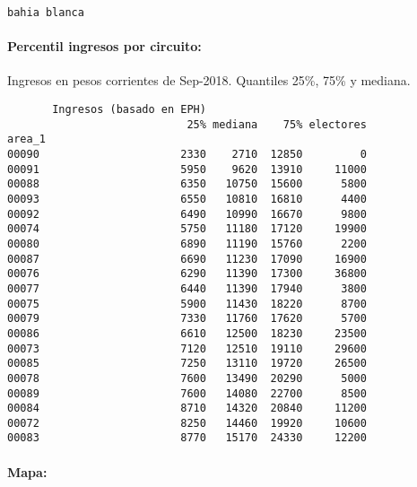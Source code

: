 \documentclass[11pt]{article}
\begin{document}
    
    \begin{Verbatim}[commandchars=\\\{\}]
bahia blanca

    \end{Verbatim}

    \hypertarget{percentil-ingresos-por-circuito}{%
\paragraph{Percentil ingresos por
circuito:}\label{percentil-ingresos-por-circuito}}

    
    Ingresos en pesos corrientes de Sep-2018. Quantiles 25\%, 75\% y
mediana.

    
    
    \begin{verbatim}
       Ingresos (basado en EPH)                         
                            25% mediana    75% electores
area_1                                                  
00090                      2330    2710  12850         0
00091                      5950    9620  13910     11000
00088                      6350   10750  15600      5800
00093                      6550   10810  16810      4400
00092                      6490   10990  16670      9800
00074                      5750   11180  17120     19900
00080                      6890   11190  15760      2200
00087                      6690   11230  17090     16900
00076                      6290   11390  17300     36800
00077                      6440   11390  17940      3800
00075                      5900   11430  18220      8700
00079                      7330   11760  17620      5700
00086                      6610   12500  18230     23500
00073                      7120   12510  19110     29600
00085                      7250   13110  19720     26500
00078                      7600   13490  20290      5000
00089                      7600   14080  22700      8500
00084                      8710   14320  20840     11200
00072                      8250   14460  19920     10600
00083                      8770   15170  24330     12200
    \end{verbatim}

    
    \hypertarget{mapa}{%
\paragraph{Mapa:}\label{mapa}}

    
    \begin{center}
    \end{center}
    { \hspace*{\fill} \\}
    
\end{document}
